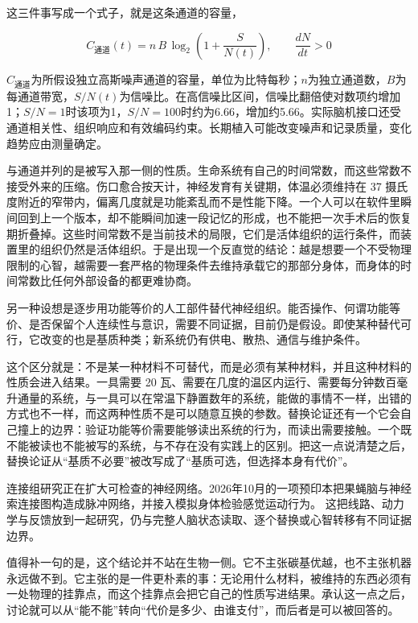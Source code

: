 这三件事写成一个式子，就是这条通道的容量，

\begin{equation}
C_{\text{通道}}(t)=n\,B\,\log_{2}\!\left(1+\frac{S}{N(t)}\right),
\qquad
\frac{dN}{dt}>0
\end{equation}

$C_{\text{通道}}$为所假设独立高斯噪声通道的容量，单位为比特每秒；$n$为独立通道数，$B$为每通道带宽，$S/N(t)$为信噪比。在高信噪比区间，信噪比翻倍使对数项约增加1；$S/N=1$时该项为1，$S/N=100$时约为6.66，增加约5.66。实际脑机接口还受通道相关性、组织响应和有效编码约束。长期植入可能改变噪声和记录质量，变化趋势应由测量确定。

与通道并列的是被写入那一侧的性质。生命系统有自己的时间常数，而这些常数不接受外来的压缩。伤口愈合按天计，神经发育有关键期，体温必须维持在 37 摄氏度附近的窄带内，偏离几度就是功能紊乱而不是性能下降。一个人可以在软件里瞬间回到上一个版本，却不能瞬间加速一段记忆的形成，也不能把一次手术后的恢复期折叠掉。这些时间常数不是当前技术的局限，它们是活体组织的运行条件，而装置里的组织仍然是活体组织。于是出现一个反直觉的结论：越是想要一个不受物理限制的心智，越需要一套严格的物理条件去维持承载它的那部分身体，而身体的时间常数比任何外部设备的都更难协商。


另一种设想是逐步用功能等价的人工部件替代神经组织。能否操作、何谓功能等价、是否保留个人连续性与意识，需要不同证据，目前仍是假设。即使某种替代可行，它改变的也是基质种类；新系统仍有供电、散热、通信与维护条件。

这个区分就是：不是某一种材料不可替代，而是必须有某种材料，并且这种材料的性质会进入结果。一具需要 20 瓦、需要在几度的温区内运行、需要每分钟数百毫升通量的系统，与一具可以在常温下静置数年的系统，能做的事情不一样，出错的方式也不一样，而这两种性质不是可以随意互换的参数。替换论证还有一个它会自己撞上的边界：验证功能等价需要能够读出系统的行为，而读出需要接触。一个既不能被读也不能被写的系统，与不存在没有实践上的区别。把这一点说清楚之后，替换论证从“基质不必要”被改写成了“基质可选，但选择本身有代价”。

连接组研究正在扩大可检查的神经网络。2026年10月的一项预印本把果蝇脑与神经索连接图构造成脉冲网络，并接入模拟身体检验感觉运动行为。\cite{minnick2026sensorimotor} 这把线路、动力学与反馈放到一起研究，仍与完整人脑状态读取、逐个替换或心智转移有不同证据边界。

值得补一句的是，这个结论并不站在生物一侧。它不主张碳基优越，也不主张机器永远做不到。它主张的是一件更朴素的事：无论用什么材料，被维持的东西必须有一处物理的挂靠点，而这个挂靠点会把它自己的性质写进结果。承认这一点之后，讨论就可以从“能不能”转向“代价是多少、由谁支付”，而后者是可以被回答的。

